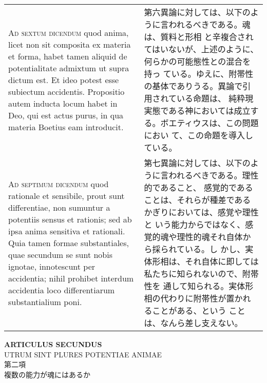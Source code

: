 \documentclass[paper=a4paper,fontsize=10pt,jafontsize=9pt,titlepage]{jlreq}
\begin{document}
\begin{longtable}{p{21em}p{21em}}
\\

{\scshape Ad sextum dicendum} quod anima, licet non sit composita ex
materia et forma, habet tamen aliquid de potentialitate admixtum ut
supra dictum est. Et ideo potest esse subiectum accidentis. Propositio
autem inducta locum habet in Deo, qui est actus purus, in qua materia
Boetius eam introducit.

&


 第六異論に対しては、以下のように言われるべきである。魂は、質料と形相
 と辛複合されてはいないが、上述のように、何らかの可能態性との混合を持っ
 ている。ゆえに、附帯性の基体でありうる。異論で引用されている命題は、
 純粋現実態である神においては成立する。ボエティウスは、この問題におい
 て、この命題を導入している。

\\



{\scshape Ad septimum dicendum} quod rationale et sensibile, prout
sunt differentiae, non sumuntur a potentiis sensus et rationis; sed ab
ipsa anima sensitiva et rationali. Quia tamen formae substantiales,
quae secundum se sunt nobis ignotae, innotescunt per accidentia; nihil
prohibet interdum accidentia loco differentiarum substantialium poni.

&

 第七異論に対しては、以下のように言われるべきである。理性的であること、
 感覚的であることは、それらが種差であるかぎりにおいては、感覚や理性と
 いう能力からではなく、感覚的魂や理性的魂それ自体から採られている。し
 かし、実体形相は、それ自体に即しては私たちに知られないので、附帯性を
 通して知られる。実体形相の代わりに附帯性が置かれることがある、という
 ことは、なんら差し支えない。


\end{longtable}
\newpage

\begin{center}
{\Large {\bfseries ARTICULUS SECUNDUS}}\\
{\large UTRUM SINT PLURES POTENTIAE ANIMAE}\\
{\Large 第二項\\複数の能力が魂にはあるか}
\end{center}
\end{document}
